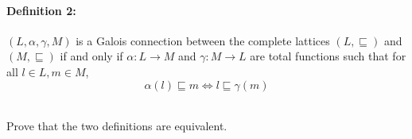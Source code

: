 \documentclass[11pt, oneside]{article}   	%
\begin{document}
\paragraph{Definition 2:}
$(L,\alpha,\gamma,M)$ is a Galois connection
between the complete lattices $(L,\sqsubseteq)$
and $(M,\sqsubseteq)$ if and only if
$\alpha:L \rightarrow M$ and $\gamma:M \rightarrow L$
are total functions such that for all $l\in L, m \in M$,
$$\alpha(l) \sqsubseteq m \Leftrightarrow l \sqsubseteq \gamma (m)$$

~\\
Prove that the two definitions are equivalent.
\end{document}
